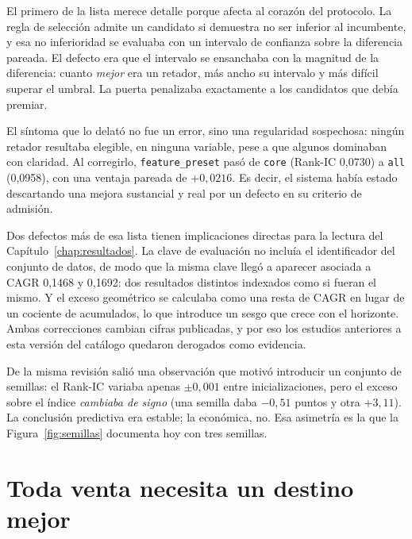 \begin{table}[H]
  \centering
  \footnotesize
  \caption{Defectos de validez detectados y efecto medido de su corrección.}
  \label{tab:defectos}
  
  \caption*{Fuente: , entrada de 2026-07-28.}
\end{table}

El primero de la lista merece detalle porque afecta al corazón del protocolo. La regla de selección
admite un candidato si demuestra no ser inferior al incumbente, y esa no inferioridad se evaluaba
con un intervalo de confianza sobre la diferencia pareada. El defecto era que el intervalo se
ensanchaba con la magnitud de la diferencia: cuanto \emph{mejor} era un retador, más ancho su
intervalo y más difícil superar el umbral. La puerta penalizaba exactamente a los candidatos que
debía premiar.

El síntoma que lo delató no fue un error, sino una regularidad sospechosa: ningún retador resultaba
elegible, en ninguna variable, pese a que algunos dominaban con claridad. Al corregirlo,
\texttt{feature\_preset} pasó de \texttt{core} (Rank-IC 0,0730) a \texttt{all} (0,0958), con una
ventaja pareada de $+0{,}0216$. Es decir, el sistema había estado descartando una mejora
sustancial y real por un defecto en su criterio de admisión.

Dos defectos más de esa lista tienen implicaciones directas para la lectura del
Capítulo~\ref{chap:resultados}. La clave de evaluación no incluía el identificador del conjunto de
datos, de modo que la misma clave llegó a aparecer asociada a CAGR 0,1468 y 0,1692: dos resultados
distintos indexados como si fueran el mismo. Y el exceso geométrico se calculaba como una resta de
CAGR en lugar de un cociente de acumulados, lo que introduce un sesgo que crece con el horizonte.
Ambas correcciones cambian cifras publicadas, y por eso los estudios anteriores a esta versión del
catálogo quedaron derogados como evidencia.

De la misma revisión salió una observación que motivó introducir un conjunto de semillas: el Rank-IC
variaba apenas $\pm 0{,}001$ entre inicializaciones, pero el exceso sobre el índice \emph{cambiaba
de signo} (una semilla daba $-0{,}51$ puntos y otra $+3{,}11$). La conclusión predictiva era
estable; la económica, no. Esa asimetría es la que la Figura~\ref{fig:semillas} documenta hoy con
tres semillas.

\section{Toda venta necesita un destino mejor}

